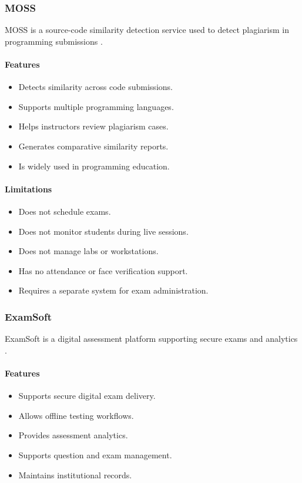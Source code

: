 \subsubsection{MOSS}
MOSS is a source-code similarity detection service used to detect plagiarism in programming submissions \cite{moss1}.

\paragraph{Features}
\begin{itemize}[noitemsep]
\item Detects similarity across code submissions.
\item Supports multiple programming languages.
\item Helps instructors review plagiarism cases.
\item Generates comparative similarity reports.
\item Is widely used in programming education.
\end{itemize}

\paragraph{Limitations}
\begin{itemize}[noitemsep]
\item Does not schedule exams.
\item Does not monitor students during live sessions.
\item Does not manage labs or workstations.
\item Has no attendance or face verification support.
\item Requires a separate system for exam administration.
\end{itemize}

\subsubsection{ExamSoft}
ExamSoft is a digital assessment platform supporting secure exams and analytics \cite{examsoft1}.

\paragraph{Features}
\begin{itemize}[noitemsep]
\item Supports secure digital exam delivery.
\item Allows offline testing workflows.
\item Provides assessment analytics.
\item Supports question and exam management.
\item Maintains institutional records.
\end{itemize}

